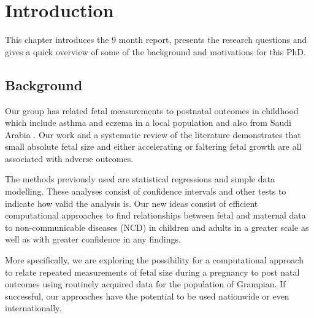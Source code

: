 \documentclass[bsc]{abdnthesis}
\begin{document}
\clearpage
\setcounter{page}{1}

\chapter{Introduction}
This chapter introduces the 9 month report, presents the research questions and gives a quick overview of some of the background and motivations for this PhD. 
\section{Background} %
\label{sec:background}
Our group has related fetal measurements to postnatal outcomes in childhood which include asthma and eczema in a local population \cite{turner1, turner2, turner3} and also from Saudi Arabia \cite{ saudi}.  Our work and a systematic review of the literature demonstrates that small absolute fetal size and either accelerating or faltering fetal growth are all associated with adverse outcomes. 

The methods previously used are statistical regressions and simple data modelling. These analyses consist of confidence intervals and other tests to indicate how valid the analysis is. Our new ideas consist of efficient computational approaches to find relationships between fetal and maternal data to non-communicable diseases (NCD) in children and adults in a greater scale as well as with greater confidence in any findings.



More specifically, we are exploring the possibility for a computational approach to relate repeated measurements of fetal size during a pregnancy to post natal outcomes using routinely acquired data for the population of Grampian. If successful, our approaches have the potential to be used nationwide or even internationally. 
\end{document}

